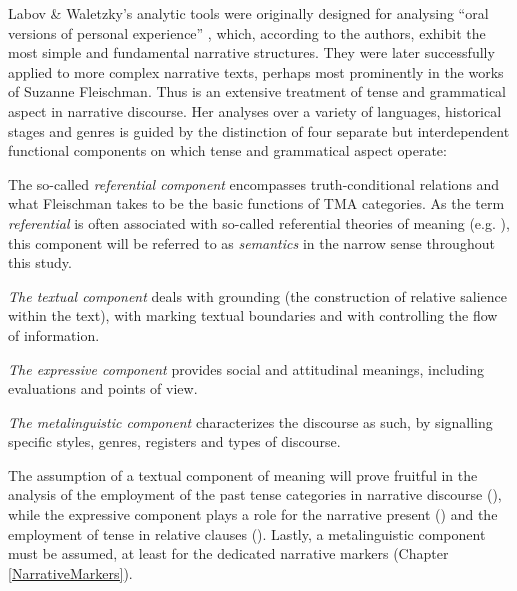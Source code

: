 Labov \& Waletzky's analytic tools were originally designed for analysing ``oral versions of personal experience'' \citep[12]{LabovWWaletzkyJ1967}, which, according to the authors, exhibit the most simple and fundamental narrative structures. They were later successfully applied to more complex narrative texts, perhaps most prominently in the works of Suzanne Fleischman. Thus \citet{FleischmanS1990} is an extensive treatment of tense and grammatical aspect in narrative discourse. Her analyses over a variety of languages, historical stages and genres is guided by the distinction of four separate but interdependent functional components on which tense and grammatical aspect operate:
\begin{compactitem}
\item The so-called \textit{referential component} encompasses truth-conditional relations and what Fleischman takes to be the basic functions of TMA categories. As the term \textit{referential} is often associated with so-called referential theories of meaning (e.g. \citealt{OgdenCKRichardsIA1923}), this component will be referred to as \textit{semantics} in the narrow sense throughout this study.
\item \textit{The textual component} deals with grounding (the construction of relative salience within the text), with marking textual boundaries and with controlling the flow of information.
\item \textit{The expressive component} provides social and attitudinal meanings, including evaluations and points of view.
\item \textit{The metalinguistic component} characterizes the discourse as such, by signalling specific styles, genres, registers and types of discourse.
\end{compactitem}

The assumption of a textual component of meaning will prove fruitful in the analysis of the employment of the past tense categories in narrative discourse (), while the expressive component plays a role for the narrative present () and the employment of tense in relative clauses (). Lastly, a metalinguistic component must be assumed, at least for the dedicated narrative markers (Chapter \ref{NarrativeMarkers}).

